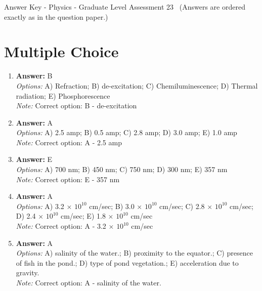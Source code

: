 \documentclass[12pt]{article}
\begin{document}
\begin{center}
Answer Key - Physics - Graduate Level Assessment 23 \
\small (Answers are ordered exactly as in the question paper.)
\end{center}

\section*{Multiple Choice}
\begin{enumerate}[label=\arabic*.]
\item \textbf{Answer:} B
\\ \textit{Options:} A) Refraction; B) de-excitation; C) Chemiluminescence; D) Thermal radiation; E) Phosphorescence
\\ \textit{Note:} Correct option: B - de-excitation
\item \textbf{Answer:} A
\\ \textit{Options:} A) 2.5 amp; B) 0.5 amp; C) 2.8 amp; D) 3.0 amp; E) 1.0 amp
\\ \textit{Note:} Correct option: A - 2.5 amp
\item \textbf{Answer:} E
\\ \textit{Options:} A) 700 nm; B) 450 nm; C) 750 nm; D) 300 nm; E) 357 nm
\\ \textit{Note:} Correct option: E - 357 nm
\item \textbf{Answer:} A
\\ \textit{Options:} A) 3.2 \ensuremath{\times} $10^10$ cm/sec; B) 3.0 \ensuremath{\times} $10^10$ cm/sec; C) 2.8 \ensuremath{\times} $10^10$ cm/sec; D) 2.4 \ensuremath{\times} $10^10$ cm/sec; E) 1.8 \ensuremath{\times} $10^10$ cm/sec
\\ \textit{Note:} Correct option: A - 3.2 \ensuremath{\times} $10^10$ cm/sec
\item \textbf{Answer:} A
\\ \textit{Options:} A) salinity of the water.; B) proximity to the equator.; C) presence of fish in the pond.; D) type of pond vegetation.; E) acceleration due to gravity.
\\ \textit{Note:} Correct option: A - salinity of the water.
\end{enumerate}
\end{document}

